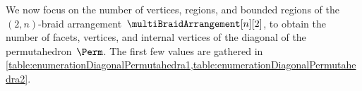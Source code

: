 \documentclass{amsart}
\theoremstyle{definition}
\begin{document}

We now focus on the number of vertices, regions, and bounded regions of the $(2,n)$-braid arrangement~$\multiBraidArrangement[n][2]$, to obtain the number of facets, vertices, and internal vertices of the diagonal of the permutahedron~$\Perm$.
The first few values are gathered in \cref{table:enumerationDiagonalPermutahedra1,table:enumerationDiagonalPermutahedra2}.
\end{document}
